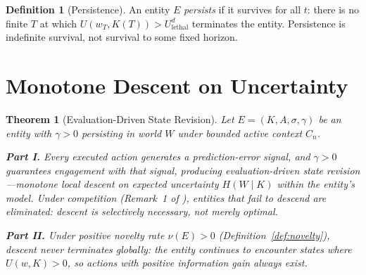 \documentclass[11pt]{article}
\newtheorem{theorem}{Theorem}
\theoremstyle{definition}
\newtheorem{definition}{Definition}
\theoremstyle{remark}
\begin{document}
\begin{definition}[Persistence]
\label{def:persistence}
An entity $E$ \emph{persists} if it survives for all $t$: there is no
finite $T$ at which $U(w_T, K(T)) > U_{\mathrm{lethal}}^d$ terminates
the entity. Persistence is indefinite survival, not survival to some
fixed horizon.
\end{definition}

\section{Monotone Descent on Uncertainty}
\label{sec:descent}

\begin{theorem}[Evaluation-Driven State Revision]
\label{thm:descent}
Let $E = (K, A, \sigma, \gamma)$ be an entity with $\gamma > 0$ persisting in
world $W$ under bounded active context $C_n$.

\textbf{Part I.} Every executed action generates a prediction-error
signal, and $\gamma > 0$ guarantees engagement with that signal,
producing evaluation-driven state revision---monotone local descent on
expected uncertainty $H(W \mid K)$ within the entity's model. Under
competition (Remark~1 of \cite{McCarthy2026a}), entities that fail to
descend are eliminated: descent is selectively necessary, not merely
optimal.

\textbf{Part II.} Under positive novelty rate $\nu(E) > 0$
(Definition~\ref{def:novelty}), descent never terminates globally:
the entity continues to encounter states where $U(w,K) > 0$, so
actions with positive information gain always exist.
\end{theorem}
\end{document}
